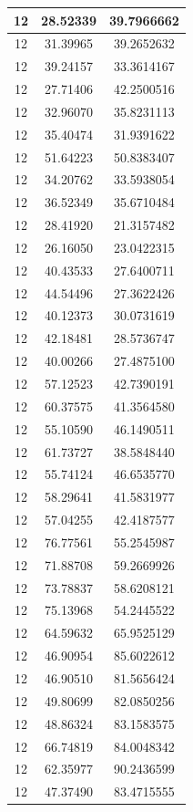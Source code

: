 \documentclass[
]{book}
\begin{document}
\begin{tabular}{c|c|c}
\hline
12 & 28.52339 & 39.7966662\\
\hline
12 & 31.39965 & 39.2652632\\
\hline
12 & 39.24157 & 33.3614167\\
\hline
12 & 27.71406 & 42.2500516\\
\hline
12 & 32.96070 & 35.8231113\\
\hline
12 & 35.40474 & 31.9391622\\
\hline
12 & 51.64223 & 50.8383407\\
\hline
12 & 34.20762 & 33.5938054\\
\hline
12 & 36.52349 & 35.6710484\\
\hline
12 & 28.41920 & 21.3157482\\
\hline
12 & 26.16050 & 23.0422315\\
\hline
12 & 40.43533 & 27.6400711\\
\hline
12 & 44.54496 & 27.3622426\\
\hline
12 & 40.12373 & 30.0731619\\
\hline
12 & 42.18481 & 28.5736747\\
\hline
12 & 40.00266 & 27.4875100\\
\hline
12 & 57.12523 & 42.7390191\\
\hline
12 & 60.37575 & 41.3564580\\
\hline
12 & 55.10590 & 46.1490511\\
\hline
12 & 61.73727 & 38.5848440\\
\hline
12 & 55.74124 & 46.6535770\\
\hline
12 & 58.29641 & 41.5831977\\
\hline
12 & 57.04255 & 42.4187577\\
\hline
12 & 76.77561 & 55.2545987\\
\hline
12 & 71.88708 & 59.2669926\\
\hline
12 & 73.78837 & 58.6208121\\
\hline
12 & 75.13968 & 54.2445522\\
\hline
12 & 64.59632 & 65.9525129\\
\hline
12 & 46.90954 & 85.6022612\\
\hline
12 & 46.90510 & 81.5656424\\
\hline
12 & 49.80699 & 82.0850256\\
\hline
12 & 48.86324 & 83.1583575\\
\hline
12 & 66.74819 & 84.0048342\\
\hline
12 & 62.35977 & 90.2436599\\
\hline
12 & 47.37490 & 83.4715555\\

\end{tabular}
\end{document}
